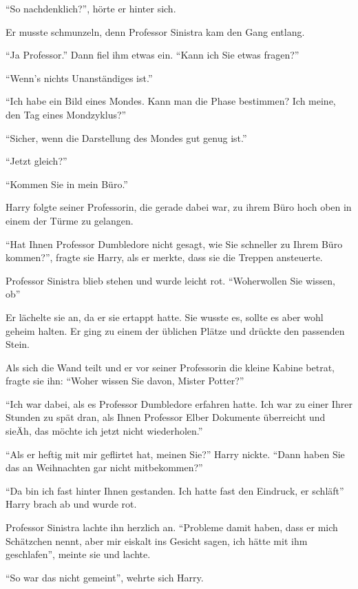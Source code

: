 \enquote{So nachdenklich?}, hörte er hinter sich.

Er musste schmunzeln, denn Professor Sinistra kam den Gang entlang.

\enquote{Ja Professor.} Dann fiel ihm etwas ein. \enquote{Kann ich Sie etwas fragen?}

\enquote{Wenn’s nichts Unanständiges ist.}

\enquote{Ich habe ein Bild eines Mondes. Kann man die Phase bestimmen? Ich meine, den Tag eines Mondzyklus?}

\enquote{Sicher, wenn die Darstellung des Mondes gut genug ist.}

\enquote{Jetzt gleich?}

\enquote{Kommen Sie in mein Büro.}

Harry folgte seiner Professorin, die gerade dabei war, zu ihrem Büro hoch oben in einem der Türme zu gelangen.

\enquote{Hat Ihnen Professor Dumbledore nicht gesagt, wie Sie schneller zu Ihrem Büro kommen?}, fragte sie Harry, als er merkte, dass sie die Treppen ansteuerte.

Professor Sinistra blieb stehen und wurde leicht rot. \enquote{Woher\abs wollen Sie wissen, ob\abs}

Er lächelte sie an, da er sie ertappt hatte. Sie wusste es, sollte es aber wohl geheim halten. Er ging zu einem der üblichen Plätze und drückte den passenden Stein.

Als sich die Wand teilt und er vor seiner Professorin die kleine Kabine betrat, fragte sie ihn: \enquote{Woher wissen Sie davon, Mister Potter?}

\enquote{Ich war dabei, als es Professor Dumbledore erfahren hatte. Ich war zu einer Ihrer Stunden zu spät dran, als Ihnen Professor Elber Dokumente überreicht und sie\abs Äh, das möchte ich jetzt nicht wiederholen.}

\enquote{Als er heftig mit mir geflirtet hat, meinen Sie?} Harry nickte. \enquote{Dann haben Sie das an Weihnachten gar nicht mitbekommen?}

\enquote{Da bin ich fast hinter Ihnen gestanden. Ich hatte fast den Eindruck, er schläft\abs} Harry brach ab und wurde rot.

Professor Sinistra lachte ihn herzlich an. \enquote{Probleme damit haben, dass er mich Schätzchen nennt, aber mir eiskalt ins Gesicht sagen, ich hätte mit ihm geschlafen}, meinte sie und lachte.

\enquote{So war das nicht gemeint}, wehrte sich Harry.

